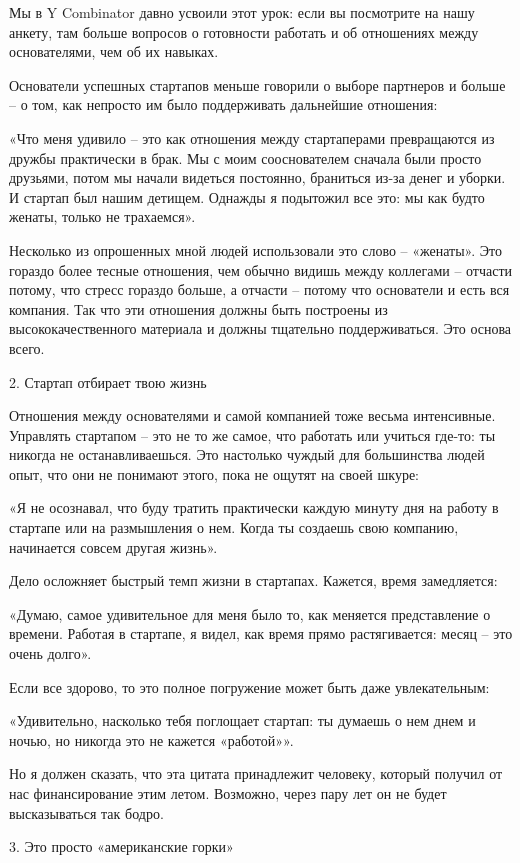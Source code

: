 \documentclass[ebook,12pt,oneside,openany]{memoir}
\begin{document}
Мы в Y Combinator давно усвоили этот урок: если вы посмотрите на нашу
анкету, там больше вопросов о готовности работать и об отношениях
между основателями, чем об их навыках.

Основатели успешных стартапов меньше говорили о выборе партнеров и
больше – о том, как непросто им было поддерживать дальнейшие
отношения:

«Что меня удивило – это как отношения между стартаперами превращаются
из дружбы практически в брак. Мы с моим сооснователем сначала были
просто друзьями, потом мы начали видеться постоянно, браниться из-за
денег и уборки. И стартап был нашим детищем. Однажды я подытожил все
это: мы как будто женаты, только не трахаемся».

Несколько из опрошенных мной людей использовали это слово – «женаты».
Это гораздо более тесные отношения, чем обычно видишь между коллегами
– отчасти потому, что стресс гораздо больше, а отчасти – потому что
основатели и есть вся компания. Так что эти отношения должны быть
построены из высококачественного материала и должны тщательно
поддерживаться. Это основа всего.

2. Стартап отбирает твою жизнь

Отношения между основателями и самой компанией тоже весьма
интенсивные. Управлять стартапом – это не то же самое, что работать
или учиться где-то: ты никогда не останавливаешься. Это настолько
чуждый для большинства людей опыт, что они не понимают этого, пока не
ощутят на своей шкуре:

«Я не осознавал, что буду тратить практически каждую минуту дня на
работу в стартапе или на размышления о нем. Когда ты создаешь свою
компанию, начинается совсем другая жизнь».

Дело осложняет быстрый темп жизни в стартапах. Кажется, время
замедляется:

«Думаю, самое удивительное для меня было то, как меняется
представление о времени. Работая в стартапе, я видел, как время прямо
растягивается: месяц – это очень долго».

Если все здорово, то это полное погружение может быть даже
увлекательным:

«Удивительно, насколько тебя поглощает стартап: ты думаешь о нем днем
и ночью, но никогда это не кажется «работой»».

Но я должен сказать, что эта цитата принадлежит человеку, который
получил от нас финансирование этим летом. Возможно, через пару лет он
не будет высказываться так бодро.

3. Это просто «американские горки»
\end{document}
